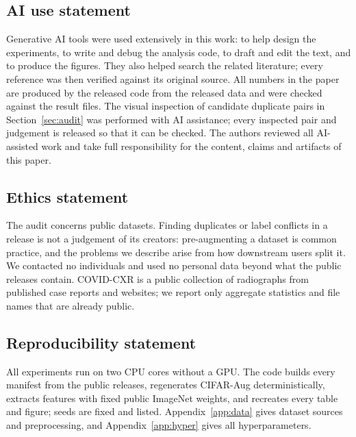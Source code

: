 \subsection*{AI use statement}
Generative AI tools were used extensively in this work: to help design the experiments, to write and debug the analysis code, to draft and edit the text, and to produce the figures. They also helped search the related literature; every reference was then verified against its original source. All numbers in the paper are produced by the released code from the released data and were checked against the result files. The visual inspection of candidate duplicate pairs in Section~\ref{sec:audit} was performed with AI assistance; every inspected pair and judgement is released so that it can be checked. The authors reviewed all AI-assisted work and take full responsibility for the content, claims and artifacts of this paper.

\subsection*{Ethics statement}
The audit concerns public datasets. Finding duplicates or label conflicts in a release is not a judgement of its creators: pre-augmenting a dataset is common practice, and the problems we describe arise from how downstream users split it. We contacted no individuals and used no personal data beyond what the public releases contain. COVID-CXR is a public collection of radiographs from published case reports and websites; we report only aggregate statistics and file names that are already public.

\subsection*{Reproducibility statement}
All experiments run on two CPU cores without a GPU. The code builds every manifest from the public releases, regenerates CIFAR-Aug deterministically, extracts features with fixed public ImageNet weights, and recreates every table and figure; seeds are fixed and listed. Appendix~\ref{app:data} gives dataset sources and preprocessing, and Appendix~\ref{app:hyper} gives all hyperparameters.

